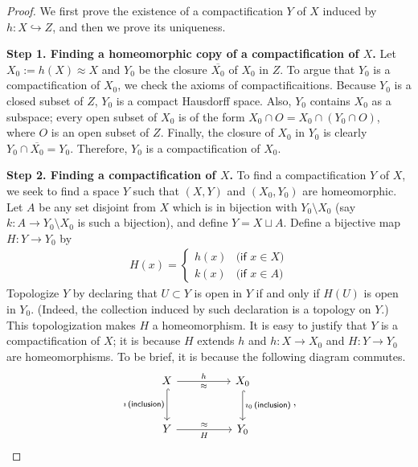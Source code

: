 \begin{proof}
    We first prove the existence of a compactification $Y$ of $X$ induced by $h: X\hookrightarrow Z$, and then we prove its uniqueness.

    \indent\textbf{Step 1. Finding a homeomorphic copy of a compactification of $X$.}\newline
    Let $X_0:=h(X)\approx X$ and $Y_0$ be the closure $\overline{X_0}$ of $X_0$ in $Z$.
    To argue that $Y_0$ is a compactification of $X_0$, we check the axioms of compactificaitions.
    Because $Y_0$ is a closed subset of $Z$, $Y_0$ is a compact Hausdorff space.
    Also, $Y_0$ contains $X_0$ as a subspace; every open subset of $X_0$ is of the form $X_0\cap O=X_0\cap(Y_0\cap O)$, where $O$ is an open subset of $Z$.
    Finally, the closure of $X_0$ in $Y_0$ is clearly $Y_0\cap\overline{X_0}=Y_0$.
    Therefore, $Y_0$ is a compactification of $X_0$.
            
    \indent\textbf{Step 2. Finding a compactification of $X$.}\newline
    To find a compactification $Y$ of $X$, we seek to find a space $Y$ such that $(X, Y)$ and $(X_0, Y_0)$ are homeomorphic.
    Let $A$ be any set disjoint from $X$ which is in bijection with $Y_0\setminus X_0$ (say $k: A\rightarrow Y_0\setminus X_0$ is such a bijection), and define $Y=X\sqcup A$.
    Define a bijective map $H: Y\rightarrow Y_0$ by
    \begin{align*}
        H(x)=\left\{
            \begin{array}{cc}
                h(x)    &   \textsf{(if $x\in X$)}\\
                k(x)    &   \textsf{(if $x\in A$)}
            \end{array}
        \right.
    \end{align*}
    Topologize $Y$ by declaring that $U\subset Y$ is open in $Y$ if and only if $H(U)$ is open in $Y_0$. (Indeed, the collection induced by such declaration is a topology on $Y$.)
    This topologization makes $H$ a homeomorphism.
    It is easy to justify that $Y$ is a compactification of $X$; it is because $H$ extends $h$ and $h: X\rightarrow X_0$ and $H: Y\rightarrow Y_0$ are homeomorphisms.
    To be brief, it is because the following diagram commutes.
    \begin{equation*}
        \begin{tikzcd}[row sep=large, column sep=huge]
            X\arrow[r, "h", "\approx"']\arrow[d, "\imath\,\textsf{(inclusion)}"', hook]
            &
            X_0\arrow[d, "\imath_0\,\textsf{(inclusion)}", hook]\\
            Y\arrow[r, "\approx", "H"'] & Y_0
        \end{tikzcd},
    \end{equation*}
    

\end{proof}
